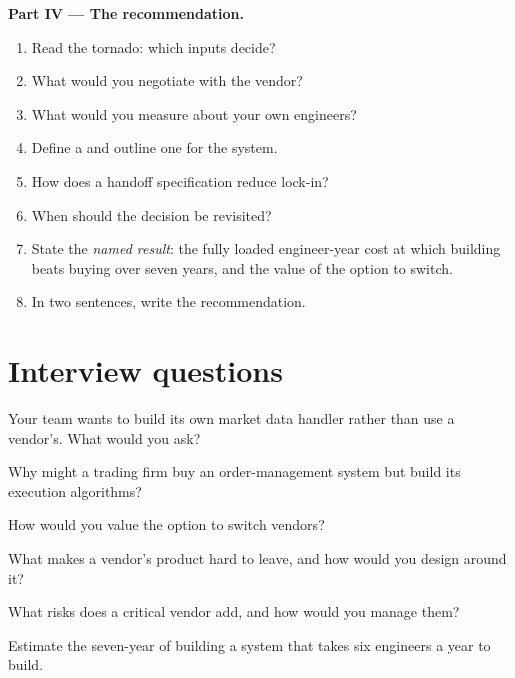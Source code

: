 \begin{problem}
\medskip\noindent\textbf{Part IV --- The recommendation.}
\begin{enumerate}[resume]
\item Read the tornado: which inputs decide?
\item What would you negotiate with the vendor?
\item What would you measure about your own engineers?
\item Define a  and outline one for the system.
\item How does a handoff specification reduce lock-in?
\item When should the decision be revisited?
\item State the \emph{named result}: the fully loaded engineer-year cost at which building beats buying over seven years, and the value of the
option to switch.
\item In two sentences, write the recommendation.
\end{enumerate}
\end{problem}

\section{Interview questions}

\begin{interviewq}\label{iq:fm:build-against-buy:1}
Your team wants to build its own market data handler rather than use a vendor's. What would you ask?
\end{interviewq}

\begin{interviewq}\label{iq:fm:build-against-buy:2}
Why might a trading firm buy an order-management system but build its execution algorithms?
\end{interviewq}

\begin{interviewq}\label{iq:fm:build-against-buy:3}
How would you value the option to switch vendors?
\end{interviewq}

\begin{interviewq}\label{iq:fm:build-against-buy:4}
What makes a vendor's product hard to leave, and how would you design around it?
\end{interviewq}

\begin{interviewq}\label{iq:fm:build-against-buy:5}
What risks does a critical vendor add, and how would you manage them?
\end{interviewq}

\begin{interviewq}\label{iq:fm:build-against-buy:6}
Estimate the seven-year  of building a system that takes six engineers a year to build.
\end{interviewq}
